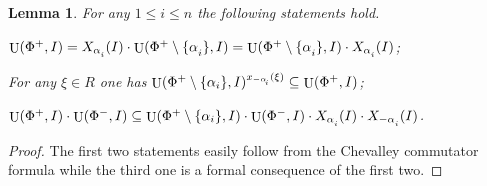 \documentclass[11pt]{amsart}
\theoremstyle{plain}
\numberwithin{equation}{section}
\newtheorem{lemma}{Lemma}
\numberwithin{lemma}{section}
\theoremstyle{definition}
\theoremstyle{remark}
\DeclareMathOperator{\U}{U}
\def\ssub#1{\mathchoice
   {_{\lower2pt\hbox{$\scriptstyle #1$}}}
   {_{\lower2pt\hbox{$\scriptstyle #1$}}}
   {_{\lower1.5pt\hbox{$\scriptscriptstyle #1$}}}
   {_{\!\lower1.5pt\hbox{$\scriptscriptstyle #1$}}}}
\begin{document}
\begin{lemma}\label{lemma:dv_unipotent} For any $1\leq i\leq n$ the following statements hold. 
\begin{thmlist} \item \label{item-dvu1} $\U(\Phi^+, I) = X_{\alpha\ssub{i}}(I)\cdot \U(\Phi^+\setminus\{\alpha\ssub{i}\}, I) = \U(\Phi^+\setminus\{\alpha\ssub{i}\}, I)\cdot X_{\alpha\ssub{i}}(I)$;
\item \label{item-dvu2} For any $\xi\in R$ one has $\U(\Phi^+\setminus\{\alpha_i\}, I)^{x_{-\alpha\ssub{i}}(\xi)} \subseteq \U(\Phi^+, I)$;
\item \label{item-dvu3} $\U(\Phi^+, I)\cdot \U(\Phi^-, I) \subseteq \U(\Phi^+\setminus \{\alpha_i\}, I) \cdot \U(\Phi^-, I) \cdot X_{\alpha\ssub{i}}(I) \cdot X_{-\alpha\ssub{i}}(I)$.
\end{thmlist} \end{lemma}
\begin{proof} The first two statements easily follow from the Chevalley commutator formula while the third one is a formal consequence of the first two. \end{proof}
\end{document}

